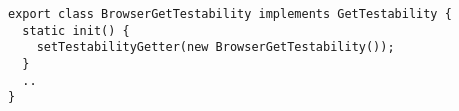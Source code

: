 \begin{verbatim}
export class BrowserGetTestability implements GetTestability {
  static init() {
    setTestabilityGetter(new BrowserGetTestability());
  }
  ..
}
\end{verbatim}
